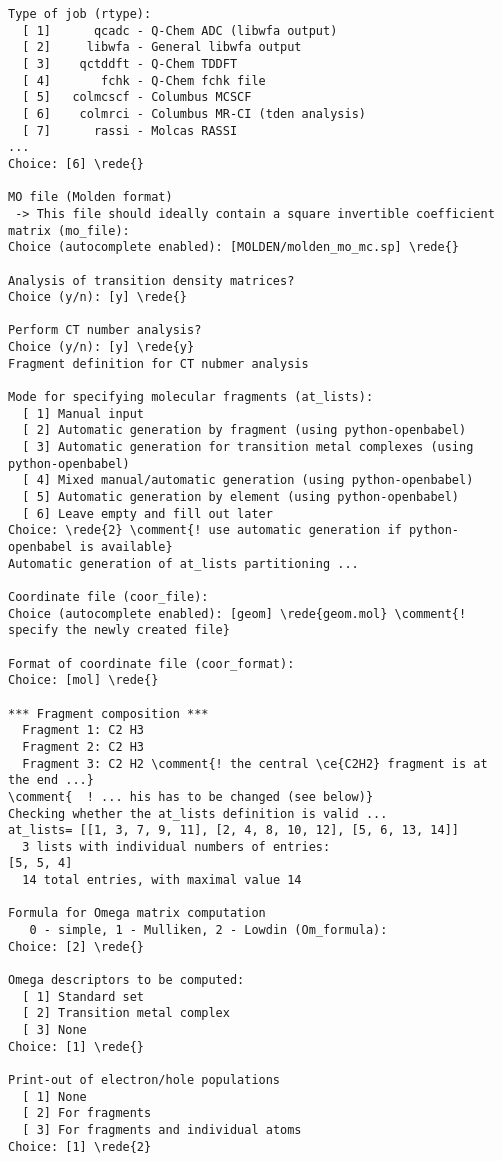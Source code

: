 \documentclass[DIV=12,headings=normal]{scrartcl}
\newcommand{\comment}[1]{\textcolor{blue}{#1}}
\newcommand{\redl}[1]{{\textcolor{red}{\underline{#1}}}}
\newcommand{\rede}[1]{\redl{#1 <ENTER>}}
\newcounter{number}
\begin{document}
\scriptsize
\begin{Verbatim}[commandchars=\\\{\}]
Type of job (rtype):
  [ 1]      qcadc - Q-Chem ADC (libwfa output)
  [ 2]     libwfa - General libwfa output
  [ 3]    qctddft - Q-Chem TDDFT
  [ 4]       fchk - Q-Chem fchk file
  [ 5]   colmcscf - Columbus MCSCF
  [ 6]    colmrci - Columbus MR-CI (tden analysis)
  [ 7]      rassi - Molcas RASSI
...
Choice: [6] \rede{}

MO file (Molden format)
 -> This file should ideally contain a square invertible coefficient matrix (mo_file):
Choice (autocomplete enabled): [MOLDEN/molden_mo_mc.sp] \rede{}

Analysis of transition density matrices?
Choice (y/n): [y] \rede{}

Perform CT number analysis?
Choice (y/n): [y] \rede{y}
Fragment definition for CT nubmer analysis

Mode for specifying molecular fragments (at_lists):
  [ 1] Manual input
  [ 2] Automatic generation by fragment (using python-openbabel)
  [ 3] Automatic generation for transition metal complexes (using python-openbabel)
  [ 4] Mixed manual/automatic generation (using python-openbabel)
  [ 5] Automatic generation by element (using python-openbabel)
  [ 6] Leave empty and fill out later
Choice: \rede{2} \comment{! use automatic generation if python-openbabel is available}
Automatic generation of at_lists partitioning ...

Coordinate file (coor_file):
Choice (autocomplete enabled): [geom] \rede{geom.mol} \comment{! specify the newly created file}

Format of coordinate file (coor_format):
Choice: [mol] \rede{}

*** Fragment composition ***
  Fragment 1: C2 H3
  Fragment 2: C2 H3
  Fragment 3: C2 H2 \comment{! the central \ce{C2H2} fragment is at the end ...}
\comment{  ! ... his has to be changed (see below)}
Checking whether the at_lists definition is valid ...
at_lists= [[1, 3, 7, 9, 11], [2, 4, 8, 10, 12], [5, 6, 13, 14]]
  3 lists with individual numbers of entries:
[5, 5, 4]
  14 total entries, with maximal value 14

Formula for Omega matrix computation
   0 - simple, 1 - Mulliken, 2 - Lowdin (Om_formula):
Choice: [2] \rede{}

Omega descriptors to be computed:
  [ 1] Standard set
  [ 2] Transition metal complex
  [ 3] None
Choice: [1] \rede{}

Print-out of electron/hole populations
  [ 1] None
  [ 2] For fragments
  [ 3] For fragments and individual atoms
Choice: [1] \rede{2}


\end{Verbatim}
\end{document}

